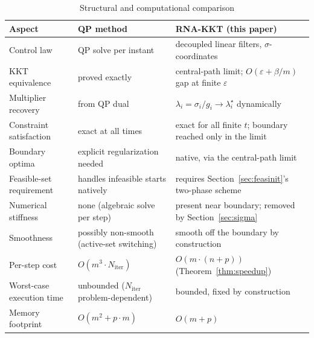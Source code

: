 \documentclass[11pt,onecolumn]{article}
\theoremstyle{definition}
\theoremstyle{remark}
\begin{document}

\begin{table}[!t]
\centering
\caption{Structural and computational comparison}
\label{tab:structural}
\begin{tabularx}{\textwidth}{@{}lXX@{}}
\toprule
Aspect & QP method \cite{allibhoy2024} & RNA-KKT (this paper) \\
\midrule
Control law & QP solve per instant & decoupled linear filters, $\sigma$-coordinates \\
KKT equivalence & proved exactly & central-path limit; $O(\varepsilon + \beta/m)$ gap at finite $\varepsilon$ \\
Multiplier recovery & from QP dual & $\lambda_i = \sigma_i/g_i \to \lambda_i^\star$ dynamically \\
Constraint satisfaction & exact at all times & exact for all finite $t$; boundary reached only in the limit \\
Boundary optima & explicit regularization needed & native, via the central-path limit \\
Feasible-set requirement & handles infeasible starts natively & requires Section~\ref{sec:feasinit}'s two-phase scheme \\
Numerical stiffness & none (algebraic solve per step) & present near boundary; removed by Section~\ref{sec:sigma} \\
Smoothness & possibly non-smooth (active-set switching) & smooth off the boundary by construction \\
Per-step cost & $O(m^3 \cdot N_{\mathrm{iter}})$ & $O(m \cdot (n+p))$ (Theorem~\ref{thm:speedup}) \\
Worst-case execution time & unbounded ($N_{\mathrm{iter}}$ problem-dependent) & bounded, fixed by construction \\
Memory footprint & $O(m^2 + p \cdot m)$ & $O(m+p)$ \\
\bottomrule
\end{tabularx}
\end{table}
\end{document}
